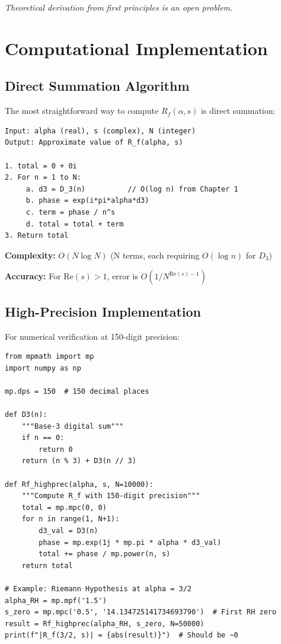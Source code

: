 \textit{Theoretical derivation from first principles is an open problem.}

\section{Computational Implementation}
\label{sec:computation}


\subsection{Direct Summation Algorithm}

The most straightforward way to compute $R_f(\alpha, s)$ is direct summation:

\begin{algorithm}
\begin{verbatim}
Input: alpha (real), s (complex), N (integer)
Output: Approximate value of R_f(alpha, s)

1. total = 0 + 0i
2. For n = 1 to N:
     a. d3 = D_3(n)          // O(log n) from Chapter 1
     b. phase = exp(i*pi*alpha*d3)
     c. term = phase / n^s
     d. total = total + term
3. Return total
\end{verbatim}
\end{algorithm}

\textbf{Complexity:} $O(N \log N)$ (N terms, each requiring $O(\log n)$ for $D_3$)

\textbf{Accuracy:} For $\text{Re}(s) > 1$, error is $O(1/N^{\text{Re}(s)-1})$

\subsection{High-Precision Implementation}

For numerical verification at 150-digit precision:

\begin{example}
\begin{verbatim}
from mpmath import mp
import numpy as np

mp.dps = 150  # 150 decimal places

def D3(n):
    """Base-3 digital sum"""
    if n == 0:
        return 0
    return (n % 3) + D3(n // 3)

def Rf_highprec(alpha, s, N=10000):
    """Compute R_f with 150-digit precision"""
    total = mp.mpc(0, 0)
    for n in range(1, N+1):
        d3_val = D3(n)
        phase = mp.exp(1j * mp.pi * alpha * d3_val)
        total += phase / mp.power(n, s)
    return total

# Example: Riemann Hypothesis at alpha = 3/2
alpha_RH = mp.mpf('1.5')
s_zero = mp.mpc('0.5', '14.134725141734693790')  # First RH zero
result = Rf_highprec(alpha_RH, s_zero, N=50000)
print(f"|R_f(3/2, s)| = {abs(result)}")  # Should be ~0
\end{verbatim}
\end{example}

